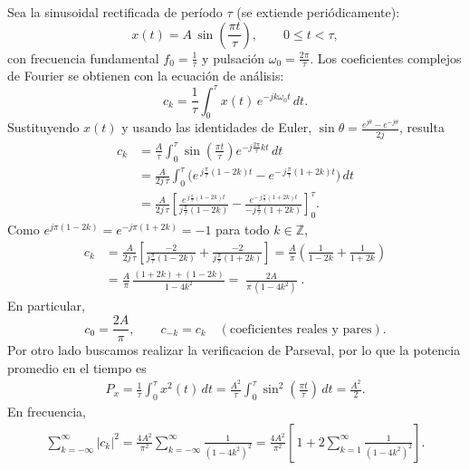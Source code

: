 \documentclass[
  11pt,
  letterpaper,
   addpoints,
   answers
  ]{exam}
\begin{document}
\begin{questions}
\begin{solution}
Sea la sinusoidal rectificada de período \(\tau\) (se extiende periódicamente):
\begin{equation}
x(t)=A\,\sin\!\left(\frac{\pi t}{\tau}\right),\qquad 0\le t<\tau,
\end{equation}
con frecuencia fundamental \(f_0=\tfrac{1}{\tau}\) y pulsación \(\omega_0=\tfrac{2\pi}{\tau}\).
Los coeficientes complejos de Fourier se obtienen con la ecuación de análisis:
\begin{equation}
c_k=\frac{1}{\tau}\int_{0}^{\tau} x(t)\,e^{-jk\omega_0 t}\,dt.
\end{equation}
Sustituyendo \(x(t)\) y usando las identidades de Euler,
\(\sin\theta=\tfrac{e^{j\theta}-e^{-j\theta}}{2j}\), resulta
\begin{align}
c_k
&=\frac{A}{\tau}\int_{0}^{\tau}\sin\!\left(\frac{\pi t}{\tau}\right)e^{-j\frac{2\pi}{\tau}kt}\,dt\\
&=\frac{A}{2j\,\tau}\int_{0}^{\tau}\Big(e^{\,j\frac{\pi}{\tau}(1-2k)t}-e^{-\,j\frac{\pi}{\tau}(1+2k)t}\Big)\,dt\\
&=\frac{A}{2j\,\tau}\left[
\frac{e^{\,j\frac{\pi}{\tau}(1-2k)t}}{j\frac{\pi}{\tau}(1-2k)}
-\frac{e^{-\,j\frac{\pi}{\tau}(1+2k)t}}{-j\frac{\pi}{\tau}(1+2k)}
\right]_{0}^{\tau}.
\end{align}
Como \(e^{j\pi(1-2k)}=e^{-j\pi(1+2k)}=-1\) para todo \(k\in\mathbb{Z}\),
\begin{align}
c_k
&=\frac{A}{2j\,\tau}\left[
\frac{-2}{j\frac{\pi}{\tau}(1-2k)}+\frac{-2}{j\frac{\pi}{\tau}(1+2k)}
\right]
=\frac{A}{\pi}\left(\frac{1}{1-2k}+\frac{1}{1+2k}\right)\\
&=\frac{A}{\pi}\,\frac{(1+2k)+(1-2k)}{1-4k^2}
=\boxed{\;\frac{2A}{\pi\,(1-4k^2)}\;}.
\end{align}
En particular,
\begin{equation}
c_0=\frac{2A}{\pi},\qquad c_{-k}=c_k\quad(\text{coeficientes reales y pares}).
\end{equation}
Por otro lado buscamos realizar la verificacion de Parseval, por lo que la potencia promedio en el tiempo es
\begin{align}
P_x
=\frac{1}{\tau}\int_{0}^{\tau}x^2(t)\,dt
=\frac{A^2}{\tau}\int_{0}^{\tau}\sin^2\!\left(\frac{\pi t}{\tau}\right)\,dt
=\frac{A^2}{2}.
\end{align}
En frecuencia,
\begin{align}
\sum_{k=-\infty}^{\infty}|c_k|^2
=\frac{4A^2}{\pi^2}\sum_{k=-\infty}^{\infty}\frac{1}{(1-4k^2)^2}
=\frac{4A^2}{\pi^2}\!\left[\,1+2\sum_{k=1}^{\infty}\frac{1}{(1-4k^2)^2}\right].
\end{align}

\end{solution}
\end{questions}
\end{document}
